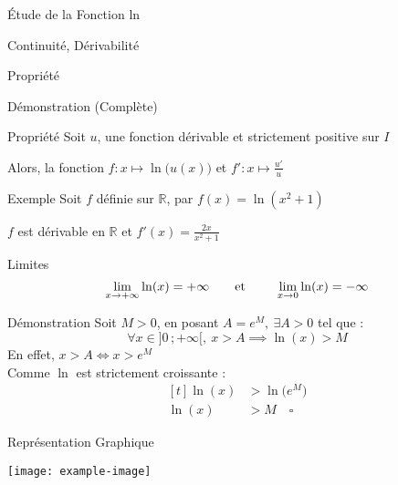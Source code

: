 \documentclass{cours}
\begin{document}
\begin{Gpartie}{Étude de la Fonction ln}
\begin{Spartie}{Continuité, Dérivabilité}
\begin{SSpartie}{Propriété}
\begin{SSSpartie}{Démonstration (Complète)}
                \end{SSSpartie}
            \end{SSpartie}
            \begin{SSpartie}{Propriété}
                Soit $u$, une fonction dérivable et strictement positive sur $I$

                Alors, la fonction $f:x\mapsto\ln\big(u(x)\big)$ et $f':x\mapsto\frac{u'}{u}$
                \begin{SSSpartie}{Exemple}
                    Soit $f$ définie sur $\mathbb{R}$, par $f(x)=\ln(x^2+1)$

                    $f$ est dérivable en $\mathbb{R}$ et $f'(x)=\frac{2x}{x^2+1}$
                \end{SSSpartie}
            \end{SSpartie}
        \end{Spartie}
        \begin{Spartie}{Limites}
            \[\lim_{x\to+\infty}\ln(x)=+\infty\text{\qquad et \qquad}\lim_{x\to 0}\ln(x)=-\infty\]
            \begin{SSpartie}{Démonstration} 
                Soit $M>0$, en posant $A=e^M,\ \exists A>0$ tel que :
                \[\forall x\in\big]0\,;+\infty\big[,\ x>A\implies\ln(x)>M\]
                En effet, $x>A\iff x>e^M$ \\ Comme $\ln$ est strictement croissante :
                \[\begin{aligned}[t]
                    \ln(x)&>\ln\big(e^M\big) \\
                    \ln(x)&>M\quad\square
                \end{aligned}\]
            \end{SSpartie}
        \end{Spartie}
        \begin{Spartie}{Représentation Graphique}
            \begin{center}
                    \texttt{[image: example-image]}
                    \parbox{\linewidth}{}
            \end{center}
        \end{Spartie}
    \end{Gpartie}
    \pagebreak
\end{document}
